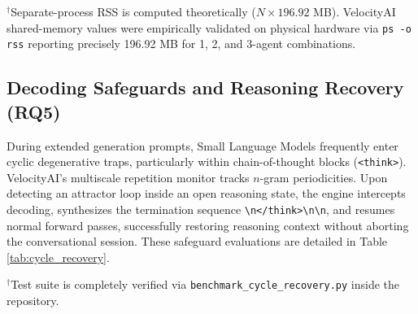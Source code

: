 \documentclass[a4paper,twocolumn,10pt]{article}
\begin{document}
\begin{table}[ht]
\centering
\small
\caption{Multi-Agent Memory Scaling (SmolLM2-360M, Sequential Pipeline)}
\label{tab:multi_agent_scaling}
\begin{flushleft}
\footnotesize $^\dagger$Separate-process RSS is computed theoretically ($N \times 196.92$ MB). VelocityAI shared-memory values were empirically validated on physical hardware via \texttt{ps -o rss} reporting precisely 196.92 MB for 1, 2, and 3-agent combinations.
\end{flushleft}
\end{table}

\subsection{Decoding Safeguards and Reasoning Recovery (RQ5)}
During extended generation prompts, Small Language Models frequently enter cyclic degenerative traps, particularly within chain-of-thought blocks (\texttt{<think>}). VelocityAI's multiscale repetition monitor tracks $n$-gram periodicities. Upon detecting an attractor loop inside an open reasoning state, the engine intercepts decoding, synthesizes the termination sequence \texttt{\textbackslash n</think>\textbackslash n\textbackslash n}, and resumes normal forward passes, successfully restoring reasoning context without aborting the conversational session. These safeguard evaluations are detailed in Table \ref{tab:cycle_recovery}.

\begin{table}[ht]
\centering
\small
\caption{Cycle-Detection Recovery Accuracy}
\label{tab:cycle_recovery}
\begin{flushleft}
\footnotesize $^\dagger$Test suite is completely verified via \texttt{benchmark\_cycle\_recovery.py} inside the repository.
\end{flushleft}
\end{table}
\end{document}
